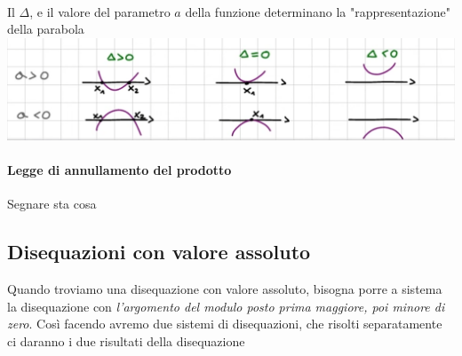 \documentclass[12pt, a4paper, openany]{book}
\begin{document}
\paragraph*{}
Il $\Delta$, e il valore del parametro $a$ della funzione determinano la "rappresentazione" della parabola
\\\includegraphics[width=\textwidth]{parabole-delta.png}

\paragraph*{Legge di annullamento del prodotto}
Segnare sta cosa

\subsection*{Disequazioni con valore assoluto}
Quando troviamo una disequazione con valore assoluto, bisogna porre a sistema la disequazione con \emph{l'argomento del modulo posto prima maggiore, poi minore di zero}.
Così facendo avremo due sistemi di disequazioni, che risolti separatamente ci daranno i due risultati della disequazione
\end{document}
